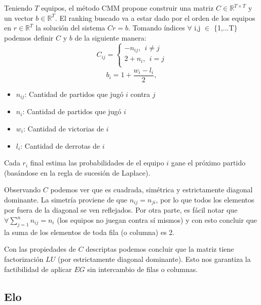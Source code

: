 \documentclass[a4paper]{article}
\begin{document}
Teniendo $T$ equipos, el método CMM propone construir una matriz $C \in \mathbb{R}^{T \times T}$ y un vector $b \in \mathbb{R}^{T}$. El ranking buscado va a estar dado por el orden de los equipos en $r \in \mathbb{R}^{T}$ la solución del sistema $Cr = b$. Tomando índices $\forall$ i,j $\in$ $\lbrace$1,...T$\rbrace$ podemos definir $C$ y $b$ de la siguiente manera:
\begin{equation}
    C_{ij} = \begin{cases}
                -n_{ij}, \ \ i \neq j\\
                2 + n_i, \ \ i = j\\
           \end{cases}
    \label{eq:Colley-Matrix}
\end{equation}
\begin{equation}
    b_i = 1 + \frac{w_i - l_i}{2},
    \label{eq:Colley-Vector}
\end{equation}
\begin{itemize}
    \item $n_{ij}$: Cantidad de partidos que jugó $i$ contra $j$
    \item $n_i$: Cantidad de partidos que jugó $i$
    \item $w_i$: Cantidad de victorias de $i$
    \item $l_i$: Cantidad de derrotas de $i$
\end{itemize}

Cada $r_i$ final estima las probabilidades de el equipo $i$ gane el próximo partido (basándose en la regla de sucesión de Laplace).

Observando $C$ podemos ver que es cuadrada, simétrica y estrictamente diagonal dominante. La simetría proviene de que $n_{ij} = n_{ji}$, por lo que todos los elementos por fuera de la diagonal se ven reflejados. Por otra parte, es fácil notar que $\forall \sum_{j=1}^n n_{ij} = n_i$ (los equipos no juegan contra sí mismos) y con esto concluir que la suma de los elementos de toda fila (o columna) es 2.

Con las propiedades de $C$ descriptas podemos concluir que la matriz tiene factorización $LU$ (por estrictamente diagonal dominante). Esto nos garantiza la factibilidad de aplicar $EG$ sin intercambio de filas o columnas.

\subsection{Elo}
\end{document}
